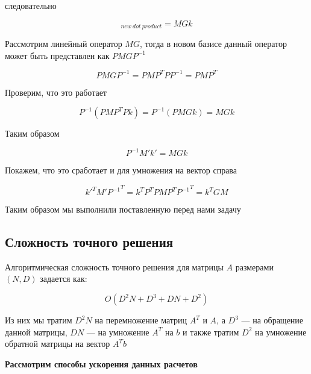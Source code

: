 \documentclass{article}
\begin{document}
    следовательно

    \begin{equation}
        [Mk]_{new \ dot \ product} = MGk
    \end{equation}

    Рассмотрим линейный оператор $MG$, тогда в новом базисе данный оператор может быть представлен как $P MG P^{-1}$

    \begin{equation}
        P MG P^{-1} = P M P^{T} P P^{-1} = P M P^{T}
    \end{equation}

    Проверим, что это работает

    \begin{equation}
        P^{-1} (P M P^{T} Pk) = P^{-1} (P M G k) = MGk
    \end{equation}

    Таким образом

    \begin{equation}
        P^{-1} M' k' = MGk
    \end{equation}

    Покажем, что это сработает и для умножения на вектор справа

    \begin{equation}
         k'^{T} M' {P^{-1}}^{T} =  k^{T} P^{T} P M P^{T} {P^{-1}}^{T} = k^{T} G M
    \end{equation}

    Таким образом мы выполнили поставленную перед нами задачу

    \subsection{Сложность точного решения}

    Алгоритмическая сложность точного решения для матрицы $A$ размерами $(N, D)$ задается как:

    \begin{equation}
        O(D^2N + D^3 + DN + D^{2})
    \end{equation}

    Из них мы тратим $D^{2}N$ на перемножение матриц $A^{T}$ и $A$, а $D^{3}$ --- на обращение данной матрицы,
    $DN$ --- на умножение $A^{T}$ на $b$ и также тратим $D^{2}$ на умножение обратной матрицы на вектор $A^{T}b$

    \quad

    \textbf{Рассмотрим способы ускорения данных расчетов}
\end{document}
